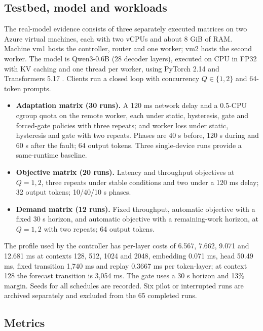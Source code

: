 \documentclass[preprint,12pt]{elsarticle}
\newcommand{\tightlist}{\setlength{\itemsep}{0pt}\setlength{\parskip}{0pt}}
\begin{document}
\hypertarget{testbed-model-and-workloads}{%
\subsection{Testbed, model and
workloads}\label{testbed-model-and-workloads}}

The real-model evidence consists of three separately executed matrices
on two Azure virtual machines, each with two vCPUs and about 8 GiB of
RAM. Machine vm1 hosts the controller, router and one worker; vm2 hosts
the second worker. The model is Qwen3-0.6B \citep{yang2025qwen3} (28
decoder layers), executed on CPU in FP32 with KV caching and one thread
per worker, using PyTorch 2.14 and Transformers 5.17
\citep{paszke2019pytorch, wolf2020transformers}. Clients run a closed
loop with concurrency \(Q\in\{1,2\}\) and 64-token prompts.

\begin{itemize}
\tightlist
\item
  \textbf{Adaptation matrix (30 runs).} A 120 ms network delay and a
  0.5-CPU cgroup quota on the remote worker, each under static,
  hysteresis, gate and forced-gate policies with three repeats; and
  worker loss under static, hysteresis and gate with two repeats. Phases
  are 40 s before, 120 s during and 60 s after the fault; 64 output
  tokens. Three single-device runs provide a same-runtime baseline.
\item
  \textbf{Objective matrix (20 runs).} Latency and throughput objectives
  at \(Q=1,2\), three repeats under stable conditions and two under a
  120 ms delay; 32 output tokens; 10/40/10 s phases.
\item
  \textbf{Demand matrix (12 runs).} Fixed throughput, automatic
  objective with a fixed 30 s horizon, and automatic objective with a
  remaining-work horizon, at \(Q=1,2\) with two repeats; 64 output
  tokens.
\end{itemize}

The profile used by the controller has per-layer costs of 6.567, 7.662,
9.071 and 12.681 ms at contexts 128, 512, 1024 and 2048, embedding 0.071
ms, head 50.49 ms, fixed transition 1,740 ms and replay 0.3667 ms per
token-layer; at context 128 the forecast transition is 3,054 ms. The
gate uses a 30 s horizon and 13\% margin. Seeds for all schedules are
recorded. Six pilot or interrupted runs are archived separately and
excluded from the 65 completed runs.

\hypertarget{metrics}{%
\subsection{Metrics}\label{metrics}}
\end{document}
